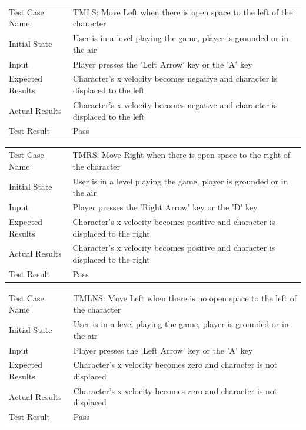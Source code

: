 \documentclass[12pt, titlepage]{article}
\begin{document}
\begin{center}
\begin{tabular}{ | l | p{10cm} | }
\hline
Test Case Name & TMLS: Move Left when there is open space to the left of the character	\\
Initial State & User is in a level playing the game, player is grounded or in the air	\\
Input & Player presses the 'Left Arrow' key or the 'A' key	\\
Expected Results & Character's x velocity becomes negative and character is displaced to the left	\\
Actual Results & Character's x velocity becomes negative and character is displaced to the left	\\
Test Result & Pass	\\
\hline
\end{tabular}
\end{center}

\begin{center}
\begin{tabular}{ | l | p{10cm} | }
\hline
Test Case Name & TMRS: Move Right when there is open space to the right of the character	\\
Initial State & User is in a level playing the game, player is grounded or in the air	\\
Input & Player presses the 'Right Arrow' key or the 'D' key	\\
Expected Results & Character's x velocity becomes positive and character is displaced to the right	\\
Actual Results & Character's x velocity becomes positive and character is displaced to the right	\\
Test Result & Pass	\\
\hline
\end{tabular}
\end{center}

\begin{center}
\begin{tabular}{ | l | p{10cm} | }
\hline
Test Case Name & TMLNS: Move Left when there is no open space to the left of the character	\\
Initial State & User is in a level playing the game, player is grounded or in the air	\\
Input & Player presses the 'Left Arrow' key or the 'A' key	\\
Expected Results & Character's x velocity becomes zero and character is not displaced	\\
Actual Results & Character's x velocity becomes zero and character is not displaced	\\
Test Result & Pass	\\
\hline
\end{tabular}
\end{center}
\end{document}
